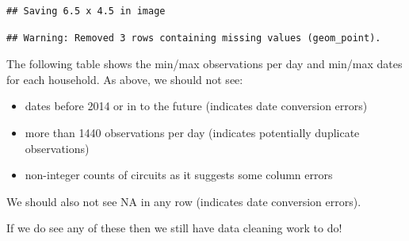 \documentclass[]{article}
\providecommand{\tightlist}{%
  \setlength{\itemsep}{0pt}\setlength{\parskip}{0pt}}
\begin{document}
\begin{verbatim}
## Saving 6.5 x 4.5 in image
\end{verbatim}

\begin{verbatim}
## Warning: Removed 3 rows containing missing values (geom_point).
\end{verbatim}

The following table shows the min/max observations per day and min/max
dates for each household. As above, we should not see:

\begin{itemize}
\tightlist
\item
  dates before 2014 or in to the future (indicates date conversion
  errors)
\item
  more than 1440 observations per day (indicates potentially duplicate
  observations)
\item
  non-integer counts of circuits as it suggests some column errors
\end{itemize}

We should also not see NA in any row (indicates date conversion errors).

If we do see any of these then we still have data cleaning work to do!
\end{document}
